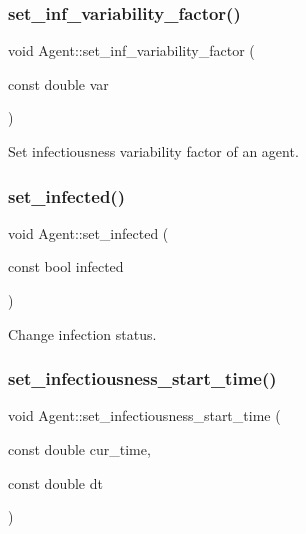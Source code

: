 \subsubsection{\texorpdfstring{set\+\_\+inf\+\_\+variability\+\_\+factor()}{set\_inf\_variability\_factor()}}
{\footnotesize\ttfamily void Agent\+::set\+\_\+inf\+\_\+variability\+\_\+factor (\begin{DoxyParamCaption}\item[{const double}]{var }\end{DoxyParamCaption})\hspace{0.3cm}{\ttfamily [inline]}}



Set infectiousness variability factor of an agent. 

\mbox{\label{classAgent_a97a65be4ac76ba2650f8e4ea136dc3d7}} 
\subsubsection{\texorpdfstring{set\+\_\+infected()}{set\_infected()}}
{\footnotesize\ttfamily void Agent\+::set\+\_\+infected (\begin{DoxyParamCaption}\item[{const bool}]{infected }\end{DoxyParamCaption})\hspace{0.3cm}{\ttfamily [inline]}}



Change infection status. 

\mbox{\label{classAgent_a151d7b2962d5238ff071c278455776e9}} 
\subsubsection{\texorpdfstring{set\+\_\+infectiousness\+\_\+start\+\_\+time()}{set\_infectiousness\_start\_time()}}
{\footnotesize\ttfamily void Agent\+::set\+\_\+infectiousness\+\_\+start\+\_\+time (\begin{DoxyParamCaption}\item[{const double}]{cur\+\_\+time,  }\item[{const double}]{dt }\end{DoxyParamCaption})\hspace{0.3cm}{\ttfamily [inline]}}



